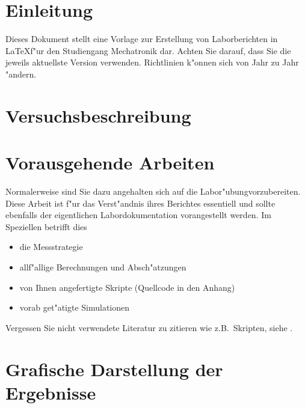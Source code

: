 \documentclass[a4paper,oneside,10pt]{article}%
\begin{document}

\pagestyle{plain}



\tableofcontents%
\listoffigures
\listoftables

\newpage

\pagestyle{fancy}

\section{Einleitung}

Dieses Dokument stellt eine Vorlage zur Erstellung von Laborberichten in \LaTeX f"ur den Studiengang Mechatronik dar. Achten Sie darauf, dass Sie die jeweils aktuellste Version verwenden. Richtlinien k"onnen sich von Jahr zu Jahr "andern.

\section{Versuchsbeschreibung}




\section{Vorausgehende Arbeiten}

Normalerweise sind Sie dazu angehalten sich auf die Labor"ubungvorzubereiten. Diese Arbeit ist f"ur das Verst"andnis ihres Berichtes essentiell und sollte ebenfalls der eigentlichen Labordokumentation vorangestellt werden. Im Speziellen betrifft dies
\begin{itemize}
\item die Messstrategie
\item allf"allige Berechnungen und Absch"atzungen
\item von Ihnen angefertigte Skripte (Quellcode in den Anhang)
\item vorab get"atigte Simulationen
\end{itemize}
Vergessen Sie nicht verwendete Literatur zu zitieren wie z.B.~Skripten, siehe \cite{meh10}.

\section{Grafische Darstellung der Ergebnisse}
\end{document}
